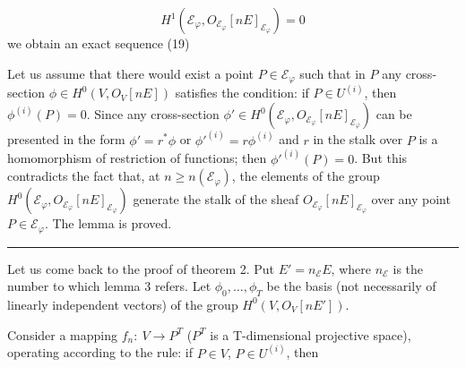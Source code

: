 \[
H^1(\mathcal E_\varphi,O_{\mathcal E_\varphi}[nE]_{\mathcal E_\varphi})=0
\]
we obtain an exact sequence
\hfill(19)

Let us assume that there would exist a point $P\in\mathcal E_\varphi$ such that in $P$ any cross-section $\phi\in H^0(V,O_V[nE])$ satisfies the condition: if $P\in U^{(i)}$, then $\phi^{(i)}(P)=0$. Since any cross-section $\phi'\in H^0(\mathcal E_\varphi,O_{\mathcal E_\varphi}[nE]_{\mathcal E_\varphi})$ can be presented in the form $\phi'=r^*\phi$ or $\phi'^{(i)}=r\phi^{(i)}$ and $r$ in the stalk over $P$ is a homomorphism of restriction of functions; then $\phi'^{(i)}(P)=0$. But this contradicts the fact that, at $n\ge n(\mathcal E_\varphi)$, the elements of the group $H^0(\mathcal E_\varphi,O_{\mathcal E_\varphi}[nE]_{\mathcal E_\varphi})$ generate the stalk of the sheaf $O_{\mathcal E_\varphi}[nE]_{\mathcal E_\varphi}$ over any point $P\in\mathcal E_\varphi$. The lemma is proved.\ \rule{0.5em}{1em}

Let us come back to the proof of theorem 2. Put $E'=n_{\mathcal E}E$, where $n_{\mathcal E}$ is the number to which lemma 3 refers. Let $\phi_0,\ldots,\phi_T$ be the basis (not necessarily of linearly independent vectors) of the group $H^0(V,O_V[nE'])$.

Consider a mapping $f_n:\ V\to P^T$ ($P^T$ is a T-dimensional projective space), operating according to the rule: if $P\in V$, $P\in U^{(i)}$, then
